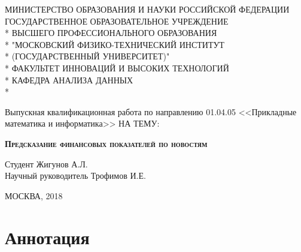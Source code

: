 \documentclass[pdftex,ptm,14pt,a4paper]{extreport}
\begin{document}
\begin{titlepage}

\newpage

\begin{center}
МИНИСТЕРСТВО ОБРАЗОВАНИЯ И НАУКИ РОССИЙСКОЙ ФЕДЕРАЦИИ \\
\vspace{0.5cm}
ГОСУДАРСТВЕННОЕ ОБРАЗОВАТЕЛЬНОЕ УЧРЕЖДЕНИЕ \\*
ВЫСШЕГО ПРОФЕССИОНАЛЬНОГО ОБРАЗОВАНИЯ\\*
"МОСКОВСКИЙ ФИЗИКО-ТЕХНИЧЕСКИЙ ИНСТИТУТ \\*
(ГОСУДАРСТВЕННЫЙ УНИВЕРСИТЕТ)" \\*
\vspace{0.5cm}
ФАКУЛЬТЕТ ИННОВАЦИЙ И ВЫСОКИХ ТЕХНОЛОГИЙ \\*
КАФЕДРА АНАЛИЗА ДАННЫХ \\*
\hrulefill
\end{center}


\vspace{4em}

\begin{center}
\Large Выпускная квалификационная работа по направлению 01.04.05 <<Прикладные математика и информатика>> \linebreak НА ТЕМУ:
\end{center}

\vspace{2.5em}

\begin{center}
\textsc{\large{\textbf{Предсказание финансовых показателей по новостям}}}
\end{center}


\begin{flushleft}
Студент \hrulefill Жигунов А.Л. \\
\vspace{1.5em}
Научный руководитель \hrulefill Трофимов И.Е.\\
\end{flushleft}

\vspace{\fill}

\begin{center}
МОСКВА, 2018
\end{center}

\end{titlepage}

\section{Аннотация}
\end{document}
